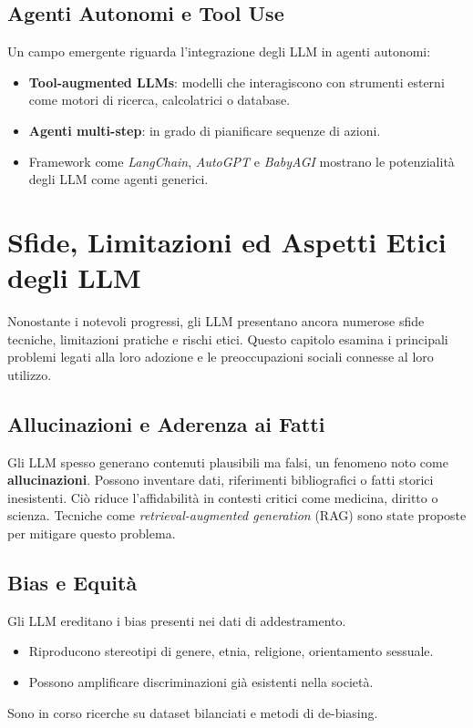 \subsection{Agenti Autonomi e Tool Use}
Un campo emergente riguarda l'integrazione degli LLM in agenti autonomi:
\begin{itemize}
    \item \textbf{Tool-augmented LLMs}: modelli che interagiscono con strumenti esterni 
    come motori di ricerca, calcolatrici o database.
    \item \textbf{Agenti multi-step}: in grado di pianificare sequenze di azioni.
    \item Framework come \textit{LangChain}, \textit{AutoGPT} e \textit{BabyAGI} mostrano 
    le potenzialità degli LLM come agenti generici.
\end{itemize}

\newpage
\section{Sfide, Limitazioni ed Aspetti Etici degli LLM}

Nonostante i notevoli progressi, gli LLM presentano ancora 
numerose sfide tecniche, limitazioni pratiche e rischi etici. 
Questo capitolo esamina i principali problemi legati alla loro adozione 
e le preoccupazioni sociali connesse al loro utilizzo.

\subsection{Allucinazioni e Aderenza ai Fatti}
Gli LLM spesso generano contenuti plausibili ma falsi, un fenomeno noto come \textbf{allucinazioni}.
Possono inventare dati, riferimenti bibliografici o fatti storici inesistenti. Ciò riduce l'affidabilità in contesti critici 
come medicina, diritto o scienza. Tecniche come \textit{\textit{retrieval-augmented generation}} (RAG) sono state proposte per mitigare questo problema.

\subsection{Bias e Equità}
Gli LLM ereditano i bias presenti nei dati di addestramento.
\begin{itemize}
    \item Riproducono stereotipi di genere, etnia, religione, orientamento sessuale.
    \item Possono amplificare discriminazioni già esistenti nella società.
\end{itemize}
Sono in corso ricerche su dataset bilanciati e metodi di de-biasing.

